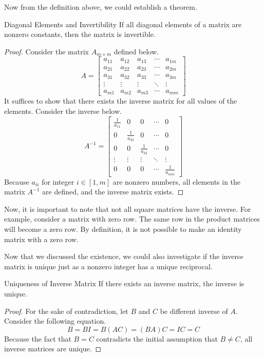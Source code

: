 \documentclass[../main.tex]{subfiles}
\begin{document}
Now from the definition above, we could establish a theorem.

\begin{theorem}{Diagonal Elements and Invertibility}
If all diagonal elements of a matrix are nonzero constants,
then the matrix is invertible.
\end{theorem}
\begin{proof}
Consider the matrix $A_{m \times m}$ defined below.
\[
A =
\begin{bmatrix}
    a_{11} & a_{12} & a_{13} & \cdots & a_{1m} \\
    a_{21} & a_{22} & a_{23} & \cdots & a_{2m} \\
    a_{31} & a_{32} & a_{33} & \cdots & a_{3m} \\
    \vdots & \vdots & \vdots & \ddots & \vdots \\
    a_{m1} & a_{m2} & a_{m3} & \cdots & a_{mm}
\end{bmatrix}
\]
It suffices to show that there exists the inverse matrix
for all values of the elements. Consider the inverse below.
\[
A^{-1} =
\begin{bmatrix}
    \frac{1}{a_{11}} & 0 & 0 & \cdots & 0 \\
    0 & \frac{1}{a_{22}} & 0 & \cdots & 0 \\
    0 & 0 & \frac{1}{a_{33}} & \cdots & 0 \\
    \vdots & \vdots & \vdots & \ddots & \vdots \\
    0 & 0 & 0 & \cdots & \frac{1}{a_{mm}}
\end{bmatrix}
\]
Because $a_{ii}$ for integer $i \in [1, m]$ are nonzero numbers,
all elements in the matrix $A^{-1}$ are defined, and the inverse
matrix exists.
\end{proof}

Now, it is important to note that not all square matrices have the
inverse. For example, consider a matrix with zero row. The same
row in the product matrices will become a zero row. By definition,
it is not possible to make an identity matrix with a zero row.

Now that we discussed the existence, we could also investigate if
the inverse matrix is unique just as a nonzero integer has a unique
reciprocal.

\begin{theorem}{Uniqueness of Inverse Matrix}
If there exists an inverse matrix, the inverse is unique.
\end{theorem}
\begin{proof}
For the sake of contradiction, let $B$ and $C$ be different
inverse of $A$. Consider the following equation.
\[
B = BI = B(AC) = (BA)C = IC = C
\]
Because the fact that $B = C$ contradicts the initial assumption
that $B \neq C$, all inverse matrices are unique.
\end{proof}
\end{document}
